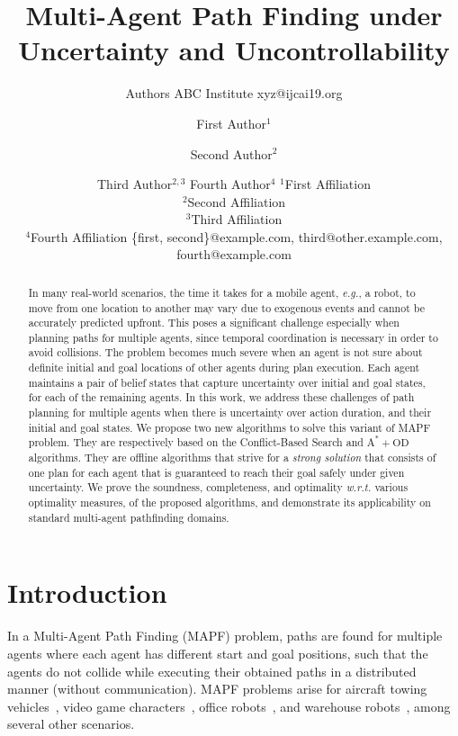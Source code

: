 \documentclass{article}
\title{Multi-Agent Path Finding under Uncertainty and Uncontrollability}
\author{
    	Authors
    	\affiliations
    	ABC Institute
  	\emails
    	xyz@ijcai19.org
}
\author{
First Author$^1$
\and
Second Author$^2$\and
Third Author$^{2,3}$\And
Fourth Author$^4$
\affiliations
$^1$First Affiliation\\
$^2$Second Affiliation\\
$^3$Third Affiliation\\
$^4$Fourth Affiliation
\emails
\{first, second\}@example.com,
third@other.example.com,
fourth@example.com
}
\begin{document}
\maketitle

\begin{abstract}
In many real-world scenarios, the time it takes for a mobile agent, \emph{e.g.}, a robot, to move from one location to another may vary due to exogenous events and cannot be accurately predicted upfront. This poses a significant challenge especially when planning paths for multiple agents, since temporal coordination is necessary in order to avoid collisions. The problem becomes much severe when an agent is not sure about definite initial and goal locations of other agents during plan execution. 
Each agent maintains a pair of belief states that capture uncertainty over initial and goal states, for each of the remaining agents.  
In this work, we address these challenges of path planning for multiple agents when there is uncertainty over action duration, and their initial and goal states. 
We propose two new algorithms to solve this variant of MAPF problem. They are respectively based on the Conflict-Based Search and $\mathrm{A^{*}+OD}$ algorithms. 
They are offline algorithms that strive for a \emph{strong solution} that consists of one plan for each agent that is guaranteed to reach their goal safely under given uncertainty. 
We prove the soundness, completeness, and optimality \emph{w.r.t.} various optimality measures, of the proposed algorithms, and demonstrate its applicability on standard multi-agent pathfinding domains.  
\end{abstract}

\section{Introduction}
In a Multi-Agent Path Finding (MAPF) problem, paths are found for multiple agents where each agent has different start and goal positions, such that the agents do not collide while executing their obtained paths in a distributed manner (without communication). 
MAPF problems arise for aircraft towing vehicles~\cite{MorrisPLMMKK16}, video game characters~\cite{Silver05}, office robots~\cite{VelosoBCR15}, and warehouse robots~\cite{WurmanDM07}, among several other scenarios.
\end{document}
